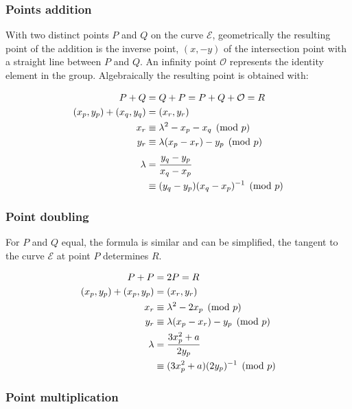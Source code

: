 \subsubsection{Points addition}
With two distinct points $P$ and $Q$ on the curve $\mathcal{E}$, geometrically
the resulting point of the addition is the inverse point, $(x, -y)$ of the
intersection point with a straight line between $P$ and $Q$. An infinity point
$\mathcal{O}$ represents the identity element in the group. Algebraically the
resulting point is obtained with:

\begin{equation}
\begin{split}
  P + Q &= Q + P = P + Q + \mathcal{O} = R \\
  (x_p, y_p) + (x_q, y_q) &= (x_r, y_r) \\
  x_r &\equiv \lambda^2 - x_p - x_q \pmod p \\
  y_r &\equiv \lambda(x_p - x_r) - y_p \pmod p  \\
  \lambda &= \cfrac{y_q - y_p}{x_q - x_p} \\
          &\equiv (y_q - y_p)(x_q - x_p)^{-1} \pmod p
\end{split}
\end{equation}

\subsubsection{Point doubling}

For $P$ and $Q$ equal, the formula is similar and can be simplified, the tangent to the curve
$\mathcal{E}$ at point $P$ determines $R$.

\begin{equation}
\begin{split}
  P + P &= 2P = R \\
  (x_p, y_p) + (x_p, y_p) &= (x_r, y_r) \\
  x_r &\equiv \lambda^2 - 2x_p \pmod p \\
  y_r &\equiv \lambda(x_p - x_r) - y_p \pmod p  \\
  \lambda &= \cfrac{3x_p^2 + a}{2y_p} \\
          &\equiv (3x_p^2 + a)(2y_p)^{-1} \pmod p
\end{split}
\end{equation}

\subsubsection{Point multiplication}

